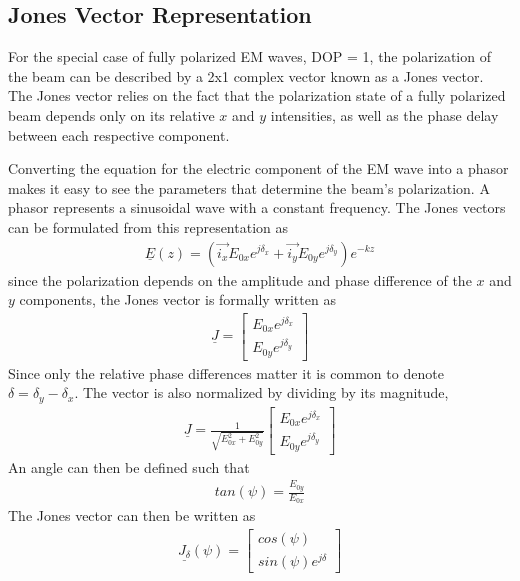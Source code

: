 \subsection{Jones Vector Representation}
For the special case of fully polarized EM waves, DOP = 1, the polarization of the beam can be described by a 2x1 complex vector known as a Jones vector.  The Jones vector relies on the fact that the polarization state of a fully polarized beam depends only on its relative $x$ and $y$ intensities, as well as the phase delay between each respective component.

Converting the equation for the electric component of the EM wave into a phasor makes it easy to see the parameters that determine the beam's polarization.  A phasor represents a sinusoidal wave with a constant frequency.  The Jones vectors can be formulated from this representation as
%
\begin{align}
    \underline{\hat{E}}(z)=(\vec{i_x} E_{0x} e^{j\delta_x}+\vec{i_y} E_{0y} e^{j\delta_y })e^{-kz}
\end{align}
%
since the polarization depends on the amplitude and phase difference of the $x$ and $y$ components, the Jones vector is formally written as
%
\begin{align}
    \underline{J} =
    \begin{bmatrix}
        E_{0x} e^{j\delta_x} \\
        E_{0y} e^{j\delta_y }
    \end{bmatrix}
\end{align}
%
Since only the relative phase differences matter it is common to denote $\delta=\delta_y-\delta_x$.  The vector is also normalized by dividing by its magnitude,
%
\begin{align}
    \underline{J} =
    \frac{1}{\sqrt{E_{0x}^2 + E_{0y}^2}}
    \begin{bmatrix}
        E_{0x} e^{j\delta_x} \\
        E_{0y} e^{j\delta_y }
    \end{bmatrix}
\end{align}
%
An angle can then be defined such that
%
\begin{align}
    tan(\psi) = \frac{E_{0y}}{E_{0x}}
\end{align}
%
The Jones vector can then be written as
%
\begin{align}
    \underline{J_{\delta}}(\psi) =
    \begin{bmatrix}
        cos(\psi) \\
        sin(\psi)e^{j\delta}
    \end{bmatrix}
\end{align}
